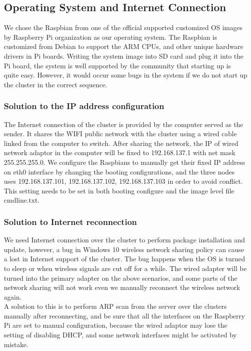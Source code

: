 \documentclass[11pt,openright,a4paper]{report}
\begin{document}
\subsection{Operating System and Internet Connection}
We chose the Raspbian from one of the official supported customized OS images by Raspberry Pi organization as our operating system. The Raspbian is customized from Debian to support the ARM CPUs, and other unique hardware drivers in Pi boards\cite{harrington2015learning}. Writing the system image into SD card and plug it into the Pi board, the system is well supported by the community that starting up is quite easy. However, it would occur some bugs in the system if we do not start up the cluster in the correct sequence.\\
\subsubsection{Solution to the IP address configuration}
 The Internet connection of the cluster is provided by the computer served as the sender. It shares the WIFI public network with the cluster using a wired cable linked from the computer to switch. After sharing the network, the IP of wired network adaptor in the computer will be fixed to 192.168.137.1 with net mask 255.255.255.0. We configure the Raspbians to manually get their fixed IP address on eth0 interface by changing the booting configurations, and the three nodes uses 192.168.137.101, 192.168.137.102, 192.168.137.103 in order to avoid conflict. This setting needs to be set in both booting configure and the image level file cmdline.txt.\\
 \subsubsection{Solution to Internet reconnection}
 We need Internet connection over the cluster to perform package installation and update, however, a bug in Windows 10 wireless network sharing policy can cause a lost in Internet support of the cluster. The bug happens when the OS is turned to sleep or when wireless signals are cut off for a while. The wired adapter will be turned into the primary adapter on the above scenarios, and some parts of the network sharing will not work even we manually reconnect the wireless network again.\\
 A solution to this is to perform ARP scan from the server over the clusters manually after reconnecting, and be sure that all the interfaces on the Raspberry Pi are set to manual configuration, because the wired adaptor may lose the setting of disabling DHCP, and some network interfaces might be activated by mistake.\\
\end{document}
